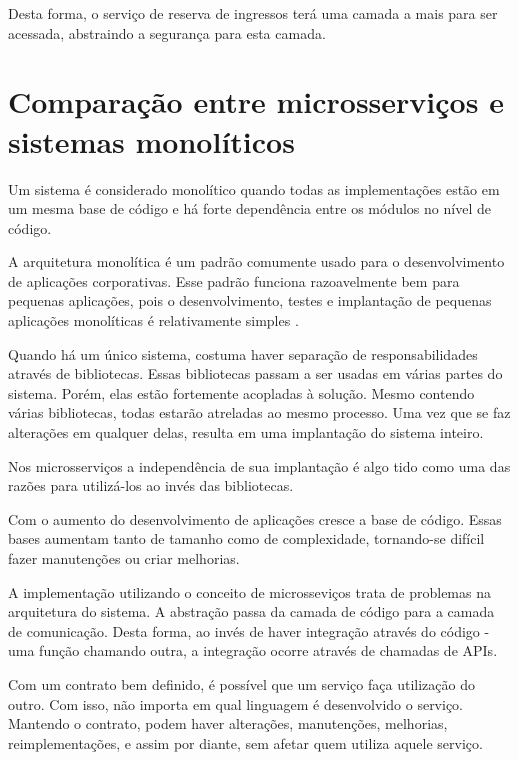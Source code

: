 Desta forma, o serviço de reserva de ingressos terá uma camada a mais
para ser acessada, abstraindo a segurança para esta camada.

\section{Comparação entre microsserviços e sistemas monolíticos}\label{microservicos-monoliticos}

Um sistema é considerado monolítico quando todas as implementações estão em um mesma base de código
e há forte dependência entre os módulos no nível de código.


\begin{citacao}
A arquitetura monolítica é um padrão comumente usado para o desenvolvimento de aplicações corporativas.
Esse padrão funciona razoavelmente bem para pequenas aplicações, pois o desenvolvimento, testes e
implantação de pequenas aplicações monolíticas é relativamente simples \cite{arquitetura-monolitica}.
\end{citacao}


Quando há um único sistema, costuma haver separação de responsabilidades através de bibliotecas.
Essas bibliotecas passam a ser usadas em várias partes do sistema. Porém, elas estão fortemente
acopladas à solução.
Mesmo contendo várias bibliotecas, todas estarão atreladas ao mesmo processo.
Uma vez que se faz alterações em qualquer delas, resulta em uma implantação do sistema inteiro.

Nos microsserviços a independência de sua implantação é algo tido como uma das razões para
utilizá-los ao invés das bibliotecas.

Com o aumento do desenvolvimento de aplicações cresce a base de código.
Essas bases aumentam tanto de tamanho como de complexidade,
tornando-se difícil fazer manutenções ou criar melhorias.

A implementação utilizando o conceito de microsseviços trata de problemas na arquitetura do sistema.
A abstração passa da camada de código para a camada de comunicação. Desta forma, ao invés de haver
integração através do código - uma função chamando outra, a integração ocorre através de chamadas de
APIs.

Com um contrato bem definido, é possível que um serviço faça utilização do outro.
Com isso, não importa em qual linguagem é desenvolvido o serviço.
Mantendo o contrato, podem haver alterações, manutenções, melhorias, reimplementações,
e assim por diante, sem afetar quem utiliza aquele serviço.

